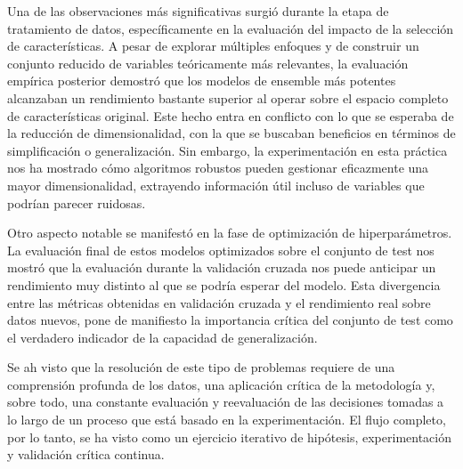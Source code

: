 \documentclass[a4paper,12pt]{article}
\begin{document}
Una de las observaciones más significativas surgió durante la etapa de tratamiento de datos, específicamente en la evaluación del impacto de la selección de características. A pesar de explorar múltiples enfoques y de construir un conjunto reducido de variables teóricamente más relevantes, la evaluación empírica posterior demostró que los modelos de ensemble más potentes alcanzaban un rendimiento bastante superior al operar sobre el espacio completo de características original. Este hecho entra en conflicto con lo que se esperaba de la reducción de dimensionalidad, con la que se buscaban beneficios en términos de simplificación o generalización. Sin embargo, la experimentación en esta práctica nos ha mostrado cómo algoritmos robustos pueden gestionar eficazmente una mayor dimensionalidad, extrayendo información útil incluso de variables que podrían parecer ruidosas.

Otro aspecto notable se manifestó en la fase de optimización de hiperparámetros. La evaluación final de estos modelos optimizados sobre el conjunto de test nos mostró que la evaluación durante la validación cruzada nos puede anticipar un rendimiento muy distinto al que se podría esperar del modelo. Esta divergencia entre las métricas obtenidas en validación cruzada y el rendimiento real sobre datos nuevos, pone de manifiesto la importancia crítica del conjunto de test como el verdadero indicador de la capacidad de generalización.

Se ah visto que la resolución de este tipo de problemas requiere de una comprensión profunda de los datos, una aplicación crítica de la metodología y, sobre todo, una constante evaluación y reevaluación de las decisiones tomadas a lo largo de un proceso que está basado en la experimentación. El flujo completo, por lo tanto, se ha visto como un ejercicio iterativo de hipótesis, experimentación y validación crítica continua.








\newpage
{}


\end{document}
